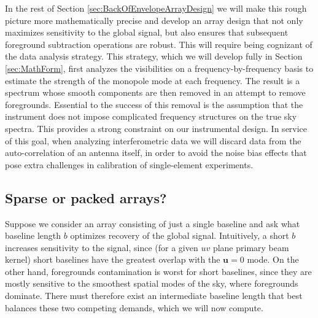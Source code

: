 \documentclass[twocolumn,apj,numberedappendix]{emulateapj}
\newcommand{\acl}[1]{}
\newcommand{\mep}[1]{}
\begin{document}
In the rest of Section \ref{sec:BackOfEnvelopeArrayDesign} we will make this rough picture more mathematically precise and develop an array design that not only maximizes sensitivity to the global signal, but also ensures that subsequent foreground subtraction operations are robust. This will require being cognizant of the data analysis strategy. This strategy, which we will develop fully in Section \ref{sec:MathForm}, first analyzes the visibilities on a frequency-by-frequency basis to estimate the strength of the monopole mode at each frequency. The result is a spectrum whose smooth components are then removed in an attempt to remove foregrounds. Essential to the success of this removal is the assumption that the instrument does not impose complicated frequency structures on the true sky spectra. This provides a strong constraint on our instrumental design. In service of this goal, when analyzing interferometric data we will discard data from the auto-correlation of an antenna itself, in order to avoid the noise bias effects that pose extra challenges in calibration of single-element experiments.


\subsection{Sparse or packed arrays?}

Suppose we consider an array consisting of just a single baseline and ask what baseline length $b$ optimizes recovery of the global signal.  Intuitively, a short $b$ increases sensitivity to the signal, since (for a given $uv$ plane primary beam kernel) short baselines have the greatest overlap with the $\mathbf{u}=0$ mode.  On the other hand, foregrounds contamination is worst for short baselines, since they are mostly sensitive to the smoothest spatial modes of the sky, where foregrounds dominate.  There must therefore exist an intermediate baseline length that best balances these two competing demands, which we will now compute.
\end{document}

